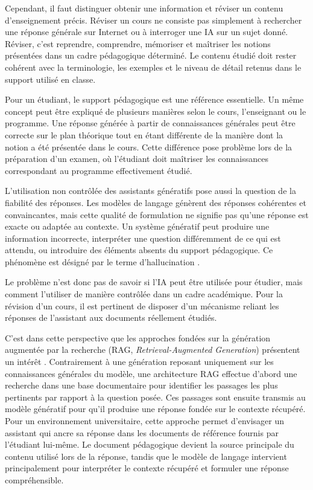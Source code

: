 \documentclass[12pt,a4paper,oneside]{report}
\begin{document}
Cependant, il faut distinguer obtenir une information et réviser un contenu d'enseignement précis. Réviser un cours ne consiste pas simplement à rechercher une réponse générale sur Internet ou à interroger une IA sur un sujet donné. Réviser, c'est reprendre, comprendre, mémoriser et maîtriser les notions présentées dans un cadre pédagogique déterminé. Le contenu étudié doit rester cohérent avec la terminologie, les exemples et le niveau de détail retenus dans le support utilisé en classe.

Pour un étudiant, le support pédagogique est une référence essentielle. Un même concept peut être expliqué de plusieurs manières selon le cours, l'enseignant ou le programme. Une réponse générée à partir de connaissances générales peut être correcte sur le plan théorique tout en étant différente de la manière dont la notion a été présentée dans le cours. Cette différence pose problème lors de la préparation d'un examen, où l'étudiant doit maîtriser les connaissances correspondant au programme effectivement étudié.

L'utilisation non contrôlée des assistants génératifs pose aussi la question de la fiabilité des réponses. Les modèles de langage génèrent des réponses cohérentes et convaincantes, mais cette qualité de formulation ne signifie pas qu'une réponse est exacte ou adaptée au contexte. Un système génératif peut produire une information incorrecte, interpréter une question différemment de ce qui est attendu, ou introduire des éléments absents du support pédagogique. Ce phénomène est désigné par le terme d'hallucination \cite{ji2023hallucination}.

Le problème n'est donc pas de savoir si l'IA peut être utilisée pour étudier, mais comment l'utiliser de manière contrôlée dans un cadre académique. Pour la révision d'un cours, il est pertinent de disposer d'un mécanisme reliant les réponses de l'assistant aux documents réellement étudiés.

C'est dans cette perspective que les approches fondées sur la génération augmentée par la recherche (RAG, \emph{Retrieval-Augmented Generation}) présentent un intérêt \cite{lewis2020rag}. Contrairement à une génération reposant uniquement sur les connaissances générales du modèle, une architecture RAG effectue d'abord une recherche dans une base documentaire pour identifier les passages les plus pertinents par rapport à la question posée. Ces passages sont ensuite transmis au modèle génératif pour qu'il produise une réponse fondée sur le contexte récupéré. Pour un environnement universitaire, cette approche permet d'envisager un assistant qui ancre sa réponse dans les documents de référence fournis par l'étudiant lui-même. Le document pédagogique devient la source principale du contenu utilisé lors de la réponse, tandis que le modèle de langage intervient principalement pour interpréter le contexte récupéré et formuler une réponse compréhensible.
\end{document}
